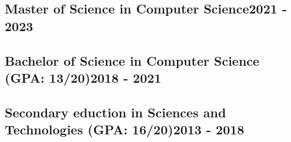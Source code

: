 \vspace*{10pt}
\subsection {{Master of Science in Computer Science}\hfill 2021 - 2023}

\vspace*{6pt}
\subsection {{Bachelor of Science in Computer Science (GPA: 13/20)}\hfill 2018 - 2021}

\vspace*{6pt}
\subsection {Secondary eduction in Sciences and Technologies {(GPA: 16/20)}\hfill 2013 - 2018}

